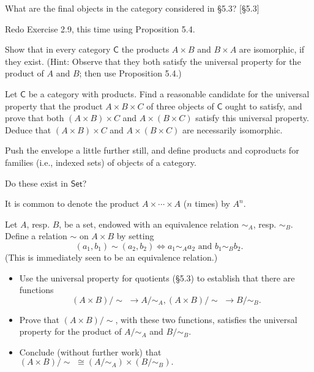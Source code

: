 \begin{problem}
  What are the final objects in the category considered in \S5.3? [\S5.3]
\end{problem}

\begin{problem}
  Redo Exercise 2.9, this time using Proposition 5.4.
\end{problem}

\begin{problem}
  \def \C {\mathsf{C}}
  Show that in every category $\C$ the products $A\times B$ and $B\times A$ are
  isomorphic, if they exist. (Hint: Observe that they both satisfy the universal
  property for the product of $A$ and $B$; then use Proposition 5.4.)
\end{problem}

\begin{problem}
  \def \C {\mathsf{C}}
  Let $\C$ be a category with products. Find a reasonable candidate for the
  universal property that the product $A\times B\times C$ of three objects of $\C$
  ought to satisfy, and prove that both $(A\times B)\times C$ and $A\times
  (B\times C)$ satisfy this universal property. Deduce that $(A\times B)\times C$
  and $A\times (B\times C)$ are necessarily isomorphic.
\end{problem}

\begin{problem}
  \def \Set {\mathsf{Set}}
  Push the envelope a little further still, and define products and coproducts
  for families (i.e., indexed sets) of objects of a category.

  Do these exist in $\Set$?

  It is common to denote the product $A\times\cdots\times A$ ($n$ times) by $A^n$.
\end{problem}

\begin{problem}
  \newcommand{\quot}[2]{#1/\!\!#2\,\,}
  \newcommand{\quotntws}[2]{#1/\!\!#2}
  Let $A$, resp. $B$, be a set, endowed with an equivalence relation $\sim_A$,
  resp. $\sim_B$.
  Define a relation $\sim$ on $A\times B$ by setting
  \[ (a_1, b_1) \sim (a_2, b_2) \iff a_1 \sim_A a_2 \text{ and } b_1 \sim_B b_2. \]
  (This is immediately seen to be an equivalence relation.)
  \begin{itemize}
  \item Use the universal property for quotients (\S5.3) to establish that there are
  functions
  \[ \quot{(A\times B)}{\sim} \to \quotntws{A}{\sim_A},
     \quot{(A\times B)}{\sim} \to \quotntws{B}{\sim_B}. \]
  \item Prove that $\quotntws{(A\times B)}{\sim}$, with these two functions,
  satisfies the universal property for the product of $\quotntws{A}{\sim_A}$ and
  $\quotntws{B}{\sim_B}$.
  \item Conclude (without further work) that $\quot{(A\times
  B)}{\sim}\cong(\quotntws{A}{\sim_A})\times(\quotntws{B}{\sim_B}).$
  \end{itemize}
\end{problem}

